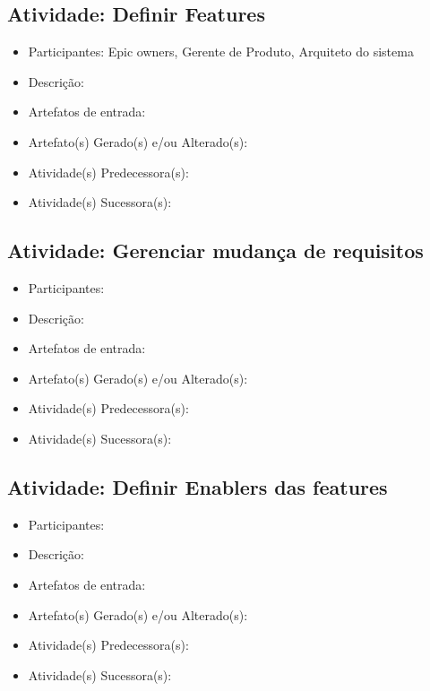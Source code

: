 
\subsection{Atividade: Definir Features}
\begin{itemize}
\item Participantes: Epic owners, Gerente de Produto, Arquiteto do sistema

\item Descrição: 

\item Artefatos de entrada: 

\item Artefato(s) Gerado(s) e/ou Alterado(s): 

\item Atividade(s) Predecessora(s): 
  
\item Atividade(s) Sucessora(s): 
\end{itemize}

\subsection{Atividade: Gerenciar mudança de requisitos}
\begin{itemize}
\item Participantes: 

\item Descrição: 

\item Artefatos de entrada: 

\item Artefato(s) Gerado(s) e/ou Alterado(s): 

\item Atividade(s) Predecessora(s): 
  
\item Atividade(s) Sucessora(s): 
\end{itemize}

\subsection{Atividade: Definir Enablers das features}
\begin{itemize}
\item Participantes: 

\item Descrição: 

\item Artefatos de entrada: 

\item Artefato(s) Gerado(s) e/ou Alterado(s): 

\item Atividade(s) Predecessora(s): 
  
\item Atividade(s) Sucessora(s): 
\end{itemize}


